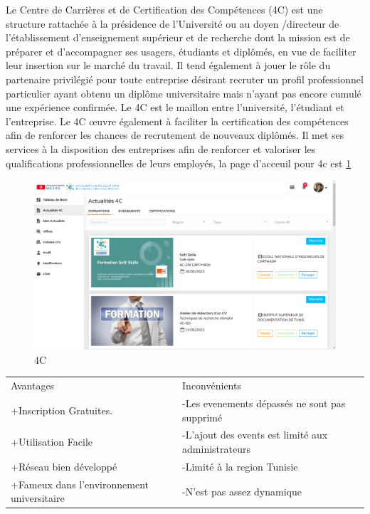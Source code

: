 \documentclass[12pt]{report}
\begin{document}
Le Centre de Carrières et de Certification des Compétences (4C) est une structure rattachée à la présidence de l’Université ou au doyen /directeur de l’établissement d’enseignement supérieur et de recherche dont la mission est de préparer et d’accompagner ses usagers, étudiants et diplômés, en vue de faciliter leur insertion sur le marché du travail.
Il tend également à jouer le rôle du partenaire privilégié pour toute entreprise désirant recruter un profil professionnel particulier ayant obtenu un diplôme universitaire mais n’ayant pas encore cumulé une expérience confirmée. Le 4C est le maillon entre l’université, l’étudiant et l’entreprise.
Le 4C œuvre également à faciliter la certification des compétences afin de renforcer les chances de recrutement de nouveaux diplômés. Il met ses services à la disposition des entreprises afin de renforcer et valoriser les qualifications professionnelles de leurs employés, la page d'acceuil pour 4c est \ref{fig:4c}
\begin{figure}[h]
    \centering
    \includegraphics[width=.8\textwidth]{4c}
    \caption{4C}
    \label{fig:4c}
\end{figure}

\begin{table}[h!]
\begin{center}
\begin{tabular}{ p{8cm}  p{8cm}  }
Avantages & Inconvénients \\
+Inscription Gratuites. & -Les evenements dépassés ne sont pas supprimé \\ 
+Utilisation Facile & -L'ajout des events est limité aux administrateurs  \\
+Réseau bien développé & -Limité à la region Tunisie \\
+Fameux dans l'environnement universitaire & -N'est pas assez dynamique\\
\end{tabular}
\end{center}
\end{table}
\end{document}
